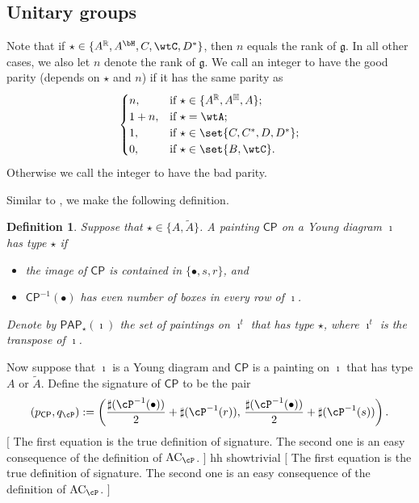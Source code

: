 \documentclass[12pt,a4paper]{amsart}
\newcommand{\trivial}[2][]{\if\relax\detokenize{#1}\relax
  {%
      \color{orange} \vspace{0em} $[$  #2 $]$
      \color{black}
  }
  \else
\ifx#1h
\ifcsname showtrivial\endcsname
{%
    \color{orange} \vspace{0em}  $[$ #2 $]$
    \color{black}
}
\fi
\else {\red Wrong argument!} \fi
\fi
}
\newcommand{\AC}{\mathrm{AC}}
\newcommand{\BH}{{\mathbb {H}}}
\newcommand{\CP}{{\mathcal {P}}}
\newcommand{\g}{\mathfrak g}
\newcommand{\R}{\mathbb R}
\numberwithin{equation}{section}
\newtheorem{defn}[thm]{Definition}
\theoremstyle{remark}
\def\ckG{\check{G}}
\def\CP{\mathsf{CP}}
\def\PAP{\mathsf{PAP}}
\begin{document}
\subsection{Unitary groups}


Note that if $\star\in \{A^\R, A^\bH, C, \wtC, D^*\}$, then $n$ equals the rank of $\g$. In all other cases, we also let $n$ denote the rank of $\g$.
We call an integer to have the good parity (depends on $\star$ and $n$) if it has the same parity as
\[
  \begin{cases}
    n, &  \text{if $\star \in \{A^\R, A^\BH,  A\}$}; \\
    1+ n, &  \text{if $\star = \wtA$}; \\
   1, & \text{if } \star \in \set{C,C^{*},D,D^{*}};\\
 \text{0}, & \text{if } \star \in \set{B,\wtC}.\\
  \end{cases}
\]
Otherwise we call the integer to have the bad parity.

Similar to , we make the following definition.

\begin{defn}\label{defpbp1}
  Suppose that $\star\in \{A, \widetilde A\}$. A painting $\CP$ on a Young diagram
  $\imath$ has type $\star$ if
  \begin{itemize}
    \item the image of $\CP$ is contained in
                  $   \{\bullet, s, r\}$, and
                    \item $\CP^{-1}(\bullet)$ has even number of boxes in
          every row of $\imath$.
  \end{itemize}
  Denote by $\PAP_\star(\imath)$ the set of paintings on $\imath^{t}$ that has type $\star$, where $\imath^{t}$
  is the transpose of $\imath$.
   \end{defn}


Now suppose that $\imath$ is a Young diagram and $\CP$ is a painting on $\imath$
that has type $A$ or $\widetilde A$. Define the signature of $\CP$ to be the pair
\begin{equation}\label{eq:signature}
    (p_\CP, q_\cP): = \left (\frac{\sharp(\cP^{-1}(\bullet))}{2}+\sharp(\cP^{-1}(r)),\,
    \frac{ \sharp(\cP^{-1}(\bullet))}{2}+\sharp(\cP^{-1}(s))\right).
\end{equation}
\trivial[h]{ The first equation is the true definition of signature. The second
  one is an easy consequence of the definition of $\AC_\cP$. }
\end{document}
